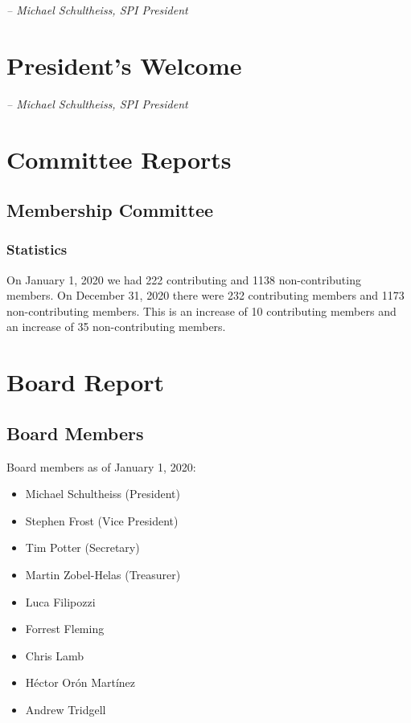 \documentclass[a4paper]{report}
\begin{document}
  \emph{-- Michael Schultheiss, SPI President}

\newpage

\tableofcontents

\newpage

\chapter{President's Welcome}
\label{sec:president}

  \emph{-- Michael Schultheiss, SPI President}

\chapter{Committee Reports}
\section{Membership Committee}

\subsection{Statistics}

On January 1, 2020 we had 222 contributing and 1138 non-contributing members.  On December 31, 2020 there were 232 contributing members and 1173 non-contributing members.  This is an increase of 10 contributing members and an increase of 35 non-contributing members.

\chapter{Board Report}
\section{Board Members}

Board members as of January 1, 2020:

\begin{itemize}
\item Michael Schultheiss (President)
\item Stephen Frost (Vice President)
\item Tim Potter (Secretary)
\item Martin Zobel-Helas (Treasurer)
\item Luca Filipozzi
\item Forrest Fleming
\item Chris Lamb
\item Héctor Orón Martínez
\item Andrew Tridgell
\end{itemize}
\end{document}
